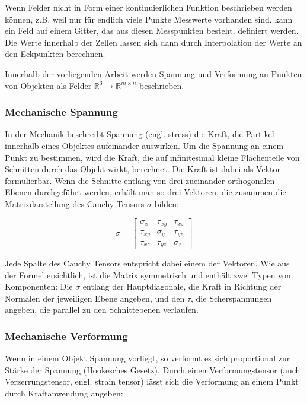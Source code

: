 \documentclass[a4paper,fontsize=12pt,toc=bib,halfparskip]{scrartcl}
\begin{document}
Wenn Felder nicht in Form einer kontinuierlichen Funktion beschrieben werden k\"onnen, z.B. weil nur f\"ur endlich viele Punkte Messwerte vorhanden sind, kann ein Feld auf einem Gitter, das aus diesen Messpunkten besteht, definiert werden. Die Werte innerhalb der Zellen lassen sich dann durch Interpolation der Werte an den Eckpunkten berechnen.


Innerhalb der vorliegenden Arbeit werden Spannung und Verformung an Punkten von Objekten als Felder $\mathbb{R}^3 \rightarrow \mathbb{R}^{m\times n}$ beschrieben.


\subsubsection{Mechanische Spannung}
In der Mechanik beschreibt Spannung (engl. stress) die Kraft, die Partikel innerhalb eines Objektes aufeinander auswirken. Um die Spannung an einem Punkt zu bestimmen, wird die Kraft, die auf infinitesimal kleine Fl\"achenteile von Schnitten durch das Objekt wirkt, berechnet. Die Kraft ist dabei als Vektor formulierbar. Wenn die Schnitte entlang von drei zueinander orthogonalen Ebenen durchgef\"uhrt werden, erh\"alt man so drei Vektoren, die zusammen die Matrixdarstellung des Cauchy Tensors $\sigma$ bilden:

\begin{equation}
	\sigma =  
	\begin{bmatrix}
		\sigma_x & \tau_{xy} & \tau_{xz}\\
		\tau_{xy} & \sigma_y & \tau_{yz}\\
		\tau_{xz} & \tau_{yz} & \sigma_z
	\end{bmatrix}
\end{equation}

Jede Spalte des Cauchy Tensors entspricht dabei einem der Vektoren. Wie aus der Formel ersichtlich, ist die Matrix symmetrisch und enth\"alt zwei Typen von Komponenten: Die $\sigma$ entlang der Hauptdiagonale, die Kraft in Richtung der Normalen der jeweiligen Ebene angeben, und den $\tau$, die Scherspannungen angeben, die parallel zu den Schnittebenen verlaufen. 

\subsubsection{Mechanische Verformung}
Wenn in einem Objekt Spannung vorliegt, so verformt es sich proportional zur St\"arke der Spannung (Hookesches Gesetz). Durch einen Verformungstensor (auch Verzerrungstensor, engl. strain tensor) l\"asst sich die Verformung an einem Punkt durch Kraftanwendung angeben:
\end{document}
